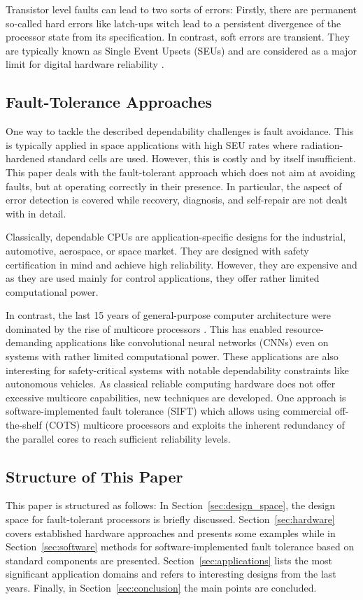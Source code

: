 \documentclass[conference]{IEEEtran}
\begin{document}
Transistor level faults can lead to two sorts of errors: Firstly, there are permanent so-called hard errors like latch-ups witch lead to a persistent divergence of the processor state from its specification. In contrast, soft errors are transient. They are typically known as Single Event Upsets (SEUs) and are considered as a major limit for digital hardware reliability \cite{Iturbe2019}.

\subsection{Fault-Tolerance Approaches}
One way to tackle the described dependability challenges is fault avoidance. This is typically applied in space applications with high SEU rates where radiation-hardened standard cells are used. However, this is costly and by itself insufficient. This paper deals with the fault-tolerant approach which does not aim at avoiding faults, but at operating correctly in their presence. In particular, the aspect of error detection is covered while recovery, diagnosis, and self-repair are not dealt with in detail.

Classically, dependable CPUs are application-specific designs for the industrial, automotive, aerospace, or space market. They are designed with safety certification in mind and achieve high reliability. However, they are expensive and as they are used mainly for control applications, they offer rather limited computational power.

In contrast, the last 15 years of general-purpose computer architecture were dominated by the rise of multicore processors \cite{Rupp2020}. This has enabled resource-demanding applications like convolutional neural networks (CNNs) even on systems with rather limited computational power. These applications are also interesting for safety-critical systems with notable dependability constraints like autonomous vehicles. As classical reliable computing hardware does not offer excessive multicore capabilities, new techniques are developed. One approach is software-implemented fault tolerance (SIFT) which allows using commercial off-the-shelf (COTS) multicore processors and exploits the inherent redundancy of the parallel cores to reach sufficient reliability levels.

\subsection{Structure of This Paper}
This paper is structured as follows: In Section~\ref{sec:design_space}, the design space for fault-tolerant processors is briefly discussed. Section~\ref{sec:hardware} covers established hardware approaches and presents some examples while in Section~\ref{sec:software} methods for software-implemented fault tolerance based on standard components are presented. Section~\ref{sec:applications} lists the most significant application domains and refers to interesting designs from the last years. Finally, in Section~\ref{sec:conclusion} the main points are concluded.
\end{document}
